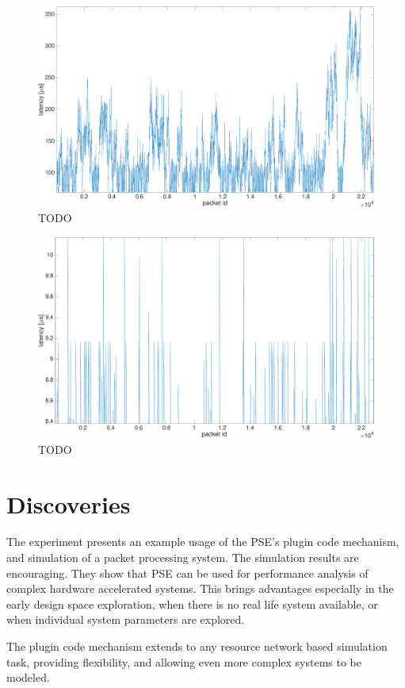 \begin{figure}[]
  \begin{center}
    \includegraphics[width=\textwidth]{images/experiment/exp2-app1-is-coremask-latency.pdf}
    \caption{TODO}
    \label{fig:exp2-app1-is-coremask-latency}
  \end{center}
\end{figure}

\begin{figure}[]
  \begin{center}
    \includegraphics[width=\textwidth]{images/experiment/exp2-app2-is-coremask-latency.pdf}
    \caption{TODO}
    \label{fig:exp2-app2-is-coremask-latency}
  \end{center}
\end{figure}

\section{Discoveries}

The experiment presents an example usage of the PSE's plugin code mechanism, and simulation of a packet processing system. The simulation results are encouraging. They show that PSE can be used for performance analysis of complex hardware accelerated systems. This brings advantages especially in the early design space exploration, when there is no real life system available, or when individual system parameters are explored.

The plugin code mechanism extends to any resource network based simulation task, providing flexibility, and allowing even more complex systems to be modeled.


